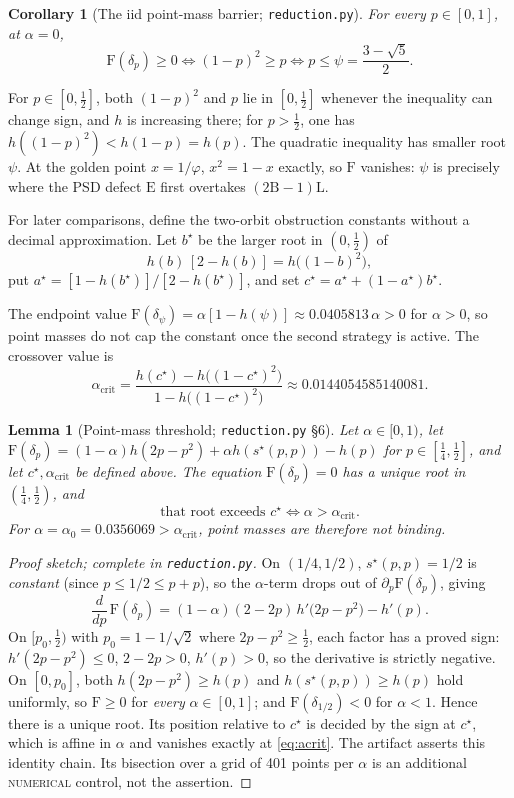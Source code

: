\documentclass[11pt]{article}
\theoremstyle{plain}
\newtheorem{lemma}[theorem]{Lemma}
\newtheorem{corollary}[theorem]{Corollary}
\theoremstyle{definition}
\theoremstyle{remark}
\newcommand{\sstar}{s^{\star}}
\newcommand{\Lb}{\mathrm{L}}
\newcommand{\Bb}{\mathrm{B}}
\newcommand{\Ee}{\mathrm{E}}
\newcommand{\Ff}{\mathrm{F}}
\newcommand{\NUMERICAL}{\textsc{numerical}}
\begin{document}
\begin{corollary}[The iid point-mass barrier; \texttt{reduction.py}]
\label{cor:psi}
For every $p\in[0,1]$, at $\alpha=0$,
\[
\Ff(\delta_p)\ge0
\iff (1-p)^2\ge p
\iff p\le\psi=\frac{3-\sqrt5}{2}.
\]
\end{corollary}

For $p\in[0,\tfrac12]$, both $(1-p)^2$ and $p$ lie in
$[0,\tfrac12]$ whenever the inequality can change sign, and $h$ is increasing
there; for $p>\tfrac12$, one has
$h((1-p)^2)<h(1-p)=h(p)$.  The quadratic inequality has smaller root
$\psi$.  At the golden point $x=1/\varphi$, $x^2=1-x$ exactly, so
$\Ff$ vanishes: $\psi$ is precisely where the PSD defect $\Ee$ first
overtakes $(2\Bb-1)\Lb$.

For later comparisons, define the two-orbit obstruction constants without a
decimal approximation.  Let $b^\star$ be the larger root in $(0,\tfrac12)$ of
\[
h(b)\,[2-h(b)]=h\bigl((1-b)^2\bigr),
\]
put $a^\star=[1-h(b^\star)]/[2-h(b^\star)]$, and set
$c^\star=a^\star+(1-a^\star)b^\star$.

The endpoint value
$\Ff(\delta_\psi)=\alpha[1-h(\psi)]\approx0.0405813\,\alpha>0$
for $\alpha>0$, so point masses do not cap the constant once the second
strategy is active.  The crossover value is
\begin{equation}
\alpha_{\mathrm{crit}}=
\frac{h(c^{\star})-h\bigl((1-c^{\star})^2\bigr)}
{1-h\bigl((1-c^{\star})^2\bigr)}
\approx0.0144054585140081.
\label{eq:acrit}
\end{equation}

\begin{lemma}[Point-mass threshold; \texttt{reduction.py} \S6]
\label{lem:acrit}
Let $\alpha\in[0,1)$, let
$\Ff(\delta_p)=(1-\alpha)h(2p-p^2)
+\alpha h(\sstar(p,p))-h(p)$ for $p\in[\tfrac14,\tfrac12]$, and let
$c^\star,\alpha_{\mathrm{crit}}$ be defined above.  The equation
$\Ff(\delta_p)=0$ has a unique root in $(\tfrac14,\tfrac12)$, and
\[
\text{that root exceeds }c^{\star}
\iff \alpha>\alpha_{\mathrm{crit}} .
\]
For $\alpha=\alpha_0=0.0356069>\alpha_{\mathrm{crit}}$, point masses are
therefore not binding.
\end{lemma}

\begin{proof}[Proof sketch; complete in \texttt{reduction.py}]
On $(1/4,1/2)$, $\sstar(p,p)=1/2$ is \emph{constant}
(since $p\le1/2\le p+p$), so the $\alpha$-term drops out of
$\partial_p\Ff(\delta_p)$, giving
\[
\frac{d}{dp}\,\Ff(\delta_p)=(1-\alpha)(2-2p)\,h'\bigl(2p-p^2\bigr)-h'(p).
\]
On $[p_0,\frac12)$ with $p_0=1-1/\sqrt2$ where $2p-p^2\ge\frac12$, each
factor has a proved sign: $h'(2p-p^2)\le0$, $2-2p>0$, $h'(p)>0$,
so the derivative is strictly negative. On $[0,p_0]$, both $h(2p-p^2)\ge
h(p)$ and $h(\sstar(p,p))\ge h(p)$ hold uniformly, so $\Ff\ge0$ for
\emph{every} $\alpha\in[0,1]$; and
$\Ff(\delta_{1/2})<0$ for $\alpha<1$.  Hence there is a unique root.  Its
position relative to $c^{\star}$ is decided by the sign at $c^{\star}$,
which is affine in $\alpha$ and vanishes exactly at \eqref{eq:acrit}.  The
artifact asserts this identity chain.  Its bisection over a grid of 401 points
per $\alpha$ is an additional \NUMERICAL{} control, not the assertion.
\end{proof}
\end{document}
